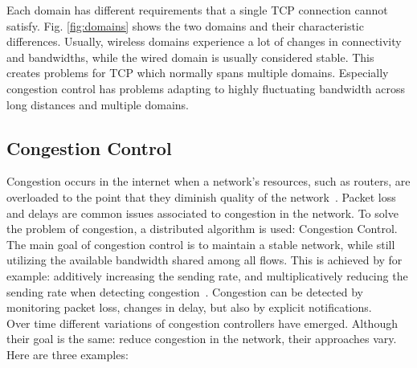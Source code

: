 \documentclass[a4paper,english, 12pt]{report}
\begin{document}
Each domain has different requirements that a single TCP connection cannot satisfy. Fig. \ref{fig:domains} shows the two domains and their characteristic differences. Usually, wireless domains experience a lot of changes in connectivity and bandwidths, while the wired domain is usually considered stable. This creates problems for TCP which normally spans multiple domains. Especially congestion control has problems adapting to highly fluctuating bandwidth across long distances and multiple domains. 

\subsection{Congestion Control}
Congestion occurs in the internet when a network's resources, such as routers, are overloaded to the point that they diminish quality of the network~\cite{rfc6077}. Packet loss and delays are common issues associated to congestion in the network. To solve the problem of congestion, a distributed algorithm is used: Congestion Control. The main goal of congestion control is to maintain a stable network, while still utilizing the available bandwidth shared among all flows. This is achieved by for example: additively increasing the sending rate, and multiplicatively reducing the sending rate when detecting congestion~\cite{welzl_congestion}. Congestion can be detected by monitoring packet loss, changes in delay, but also by explicit notifications.\\

Over time different variations of congestion controllers have emerged. Although their goal is the same: reduce congestion in the network, their approaches vary. Here are three examples:
\end{document}
